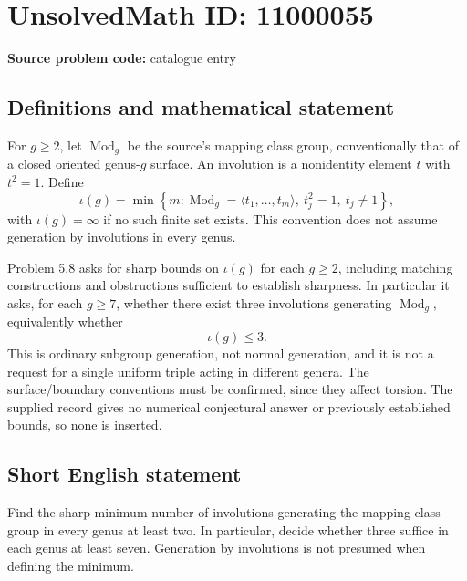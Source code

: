 \documentclass[11pt]{article}
\begin{document}
\section*{UnsolvedMath ID: 11000055}
\textbf{Source problem code:} catalogue entry
\subsection{Definitions and mathematical statement}
For \(g\ge2\), let \(\operatorname{Mod}_g\) be the source's mapping class group, conventionally that of a closed oriented genus-\(g\) surface. An involution is a nonidentity element \(t\) with \(t^2=1\). Define
\[
 \iota(g)=\min\left\{m:\operatorname{Mod}_g=\langle t_1,\ldots,t_m\rangle,
                  \ t_j^2=1,\ t_j\ne1\right\},
\]
with \(\iota(g)=\infty\) if no such finite set exists. This convention does not assume generation by involutions in every genus.

Problem 5.8 asks for sharp bounds on \(\iota(g)\) for each \(g\ge2\), including matching constructions and obstructions sufficient to establish sharpness. In particular it asks, for each \(g\ge7\), whether there exist three involutions generating \(\operatorname{Mod}_g\), equivalently whether
\[
 \iota(g)\le3.
\]
This is ordinary subgroup generation, not normal generation, and it is not a request for a single uniform triple acting in different genera. The surface/boundary conventions must be confirmed, since they affect torsion. The supplied record gives no numerical conjectural answer or previously established bounds, so none is inserted.
\subsection{Short English statement}
Find the sharp minimum number of involutions generating the mapping class group in every genus at least two. In particular, decide whether three suffice in each genus at least seven. Generation by involutions is not presumed when defining the minimum.
\end{document}
